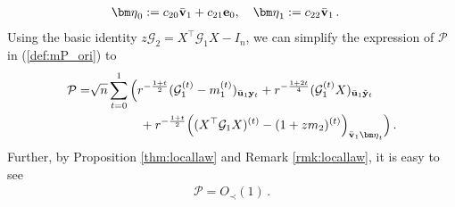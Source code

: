 \documentclass[12pt]{article}
\numberwithin{equation}{section}
\theoremstyle{remark}
\newcommand{\1}{{\rm 1}\kern-0.24em{\rm I}}
\begin{document}
\begin{appendices}
\begin{align}
 & {\bm \eta}_0:= c_{20}\bar{\bf v}_1+ c_{21} {\bf e}_0,\quad {\bm \eta}_1:= c_{22}\bar{\bf v}_1\,.
 \end{align}
Using the basic identity $z\mathcal{G}_2= {X}^{\top} \mathcal{G}_1{X}- I_n$,
 we can simplify the expression of $\mathcal{P}$ in (\ref{def:mP_ori}) to 
 \begin{align}\label{20210205}
 \mathcal{P}=&\sqrt n \sum_{t=0}^1 \Big( r^{-\frac{1+t}{2}}(\mathcal{G}_1^{(t)}-m_1^{(t)})_{\bar{\bf u}_1{\bf y}_t} + r^{-\frac{1+2t}{4}}( \mathcal{G}_1^{(t)} {X})_{\bar{\bf u}_1\tilde{{\bf y}}_t} \notag\\
 &\qquad\qquad+  r^{-\frac{1+t}{2}}\Big(({X}^{\top} \mathcal{G}_1{X})^{(t)}-(1+zm_2)^{(t)}\Big)_{\bar{\bf v}_1{\bm \eta}_t}\Big)\,.
 \end{align}
 Further, by Proposition \ref{thm:locallaw} and Remark \ref{rmk:locallaw}, it is easy to see 
 \begin{align}\label{est:P}
 \mathcal{P} = O_\prec(1)\,.
 \end{align}
 

\end{appendices}
\end{document}

